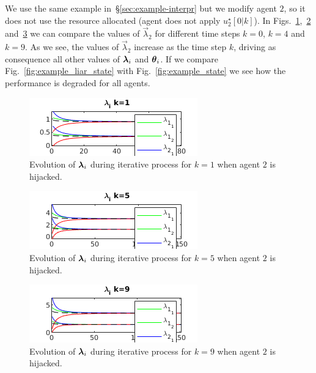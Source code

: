 \documentclass[../main.tex]{subfiles}
\begin{document}
We use the same example in~\S\ref{sec:example-interpr} but we modify agent $2$, so it does not use the resource allocated (agent does not apply $u_{2}^{\star}[0|k]$).
In Figs.~\ref{fig:example_liar_lambda1},~\ref{fig:example_liar_lambda5} and~\ref{fig:example_liar_lambda10} we can compare the values of $\vec{\lambda}_{2}$ for different time steps $k=0$, $k=4$ and $k=9$.
As we see, the values of $\vec{\lambda}_{2}$ increase as the time step $k$, driving as consequence all other values of $\boldsymbol{\lambda}_i$ and $\boldsymbol{\theta}_i$.
If we compare Fig.~\ref{fig:example_liar_state} with Fig.~\ref{fig:example_state} we see how the performance is degraded for all agents.
\begin{figure}[h]
  \centering
  \includegraphics[width=.5\textwidth]{../img/example_liar_lambda1.png}
  \caption{Evolution of $\boldsymbol{\lambda}_i$ during iterative process for $k=1$ when agent $2$ is hijacked. }\label{fig:example_liar_lambda1}
\end{figure}

\begin{figure}[h]
  \centering
  \includegraphics[width=.5\textwidth]{../img/example_liar_lambda5.png}
  \caption{Evolution of $\boldsymbol{\lambda}_i$ during iterative process for $k=5$ when agent $2$ is hijacked. }\label{fig:example_liar_lambda5}
\end{figure}

\begin{figure}[h]
  \centering
  \includegraphics[width=.5\textwidth]{../img/example_liar_lambda10.png}
  \caption{Evolution of $\boldsymbol{\lambda}_i$ during iterative process for $k=9$ when agent $2$ is hijacked. }\label{fig:example_liar_lambda10}
\end{figure}
\end{document}
